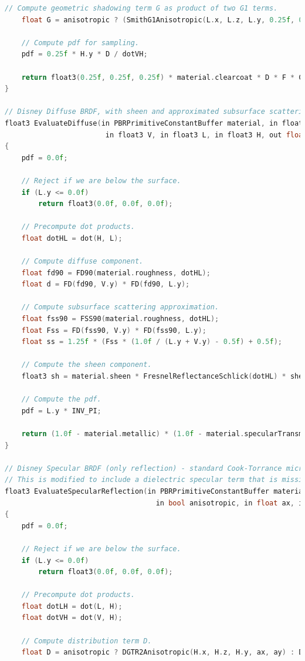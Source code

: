 \documentclass[12pt,a4paper]{report}
\numberwithin{equation}{section} %
\begin{document}
\begin{appendices}
\begin{lstlisting}[caption={Evaluarea și eșantionarea BSDF-ului Disney},label={lst:bsdf},language=C++,escapechar=\$]
	// Compute geometric shadowing term G as product of two G1 terms.
	float G = anisotropic ? (SmithG1Anisotropic(L.x, L.z, L.y, 0.25f, 0.25f) * SmithG1Anisotropic(V.x, V.z, V.y, 0.25f, 0.25f)) : (SmithG1(L.y, 0.25f) * SmithG1(V.y, 0.25f));

	// Compute pdf for sampling.
	pdf = 0.25f * H.y * D / dotVH;

	return float3(0.25f, 0.25f, 0.25f) * material.clearcoat * D * F * G / (4.0f * L.y * V.y);
}

// Disney Diffuse BRDF, with sheen and approximated subsurface scattering.
float3 EvaluateDiffuse(in PBRPrimitiveConstantBuffer material, in float3 sheenColor,
						in float3 V, in float3 L, in float3 H, out float pdf)
{
	pdf = 0.0f;

	// Reject if we are below the surface.
	if (L.y <= 0.0f)
		return float3(0.0f, 0.0f, 0.0f);

	// Precompute dot products.
	float dotHL = dot(H, L);

	// Compute diffuse component.
	float fd90 = FD90(material.roughness, dotHL);
	float d = FD(fd90, V.y) * FD(fd90, L.y);

	// Compute subsurface scattering approximation.
	float fss90 = FSS90(material.roughness, dotHL);
	float Fss = FD(fss90, V.y) * FD(fss90, L.y);
	float ss = 1.25f * (Fss * (1.0f / (L.y + V.y) - 0.5f) + 0.5f);

	// Compute the sheen component.
	float3 sh = material.sheen * FresnelReflectanceSchlick(dotHL) * sheenColor;

	// Compute the pdf.
	pdf = L.y * INV_PI;

	return (1.0f - material.metallic) * (1.0f - material.specularTransmission) * (INV_PI * material.albedo.xyz * lerp(d, ss, material.subsurface) + sh);
}

// Disney Specular BRDF (only reflection) - standard Cook-Torrance microfacet BRDF.
// This is modified to include a dielectric specular term that is missing in the diffuse model.
float3 EvaluateSpecularReflection(in PBRPrimitiveConstantBuffer material, in float eta, in float3 specularColor, in float3 V, in float3 L, in float3 H,
									in bool anisotropic, in float ax, in float ay, out float pdf)
{
	pdf = 0.0f;

	// Reject if we are below the surface.
	if (L.y <= 0.0f)
		return float3(0.0f, 0.0f, 0.0f);

	// Precompute dot products.
	float dotLH = dot(L, H);
	float dotVH = dot(V, H);

	// Compute distribution term D.
	float D = anisotropic ? DGTR2Anisotropic(H.x, H.z, H.y, ax, ay) : DGTR2(H.y, material.roughness);


\end{lstlisting}
\end{appendices}
\end{document}
